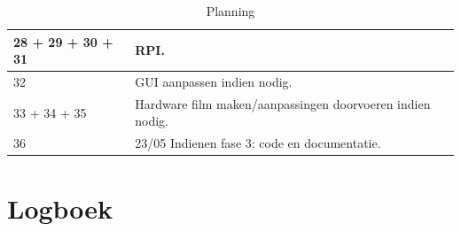\documentclass{article}
\begin{document}
\begin{table}[h!]
        \centering
        \begin{tabular}{|p{2cm}|p{11cm}|}
                \hline
                28 + 29 + 30 + 31 & RPI.\\
                \hline
                32 & GUI aanpassen indien nodig.\\
                \hline
                33 + 34 + 35 & Hardware film maken/aanpassingen doorvoeren indien nodig.\\
                \hline
                36 & 23/05 Indienen fase 3: code en documentatie.\\
                \hline
        \end{tabular}
        \caption{Planning}
\end{table}
\section{Logboek}
\end{document}
